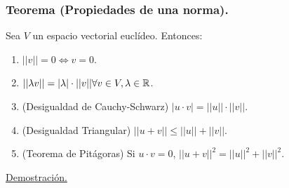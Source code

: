\documentclass[12pt, a4paper, ones, notitlepage, openany,titlepage]{article}
\begin{document}
\subsubsection{Teorema (Propiedades de una norma).}
Sea $V$ un espacio vectorial euclídeo. Entonces:
\begin{enumerate}
	\item $||v|| = 0 \Longleftrightarrow v = 0$.
	\item $||\lambda v|| = |\lambda| \cdot ||v|| \space \forall v \in V, \lambda \in \mathbb{R}$.
	\item (Desigualdad de Cauchy-Schwarz) 
	$|u \cdot v| = ||u|| \cdot ||v||$.
	\item (Desigualdad Triangular) $||u + v|| \le ||u|| + ||v||$.
	\item (Teorema de Pitágoras) Si $u \cdot v = 0$, $||u + v||^{2} = ||u||^{2} + ||v||^{2}$.
\end{enumerate}
\underline{Demostración.}
\end{document}
